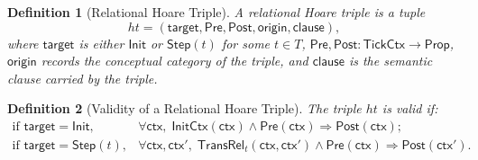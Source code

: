 \documentclass[11pt,a4paper]{article}
\newtheorem{definition}{Definition}[section]
\newcommand{\TickCtx}{\mathsf{TickCtx}}
\newcommand{\ctx}{\mathsf{ctx}}
\begin{document}
\begin{definition}[Relational Hoare Triple]
A relational Hoare triple is a tuple
\[
ht = (\mathsf{target},\mathsf{Pre},\mathsf{Post},\mathsf{origin},\mathsf{clause}),
\]
where \(\mathsf{target}\) is either \(\mathsf{Init}\) or \(\mathsf{Step}(t)\)
for some \(t \in T\), \(\mathsf{Pre},\mathsf{Post} : \TickCtx \to \mathsf{Prop}\),
\(\mathsf{origin}\) records the conceptual category of the triple, and
\(\mathsf{clause}\) is the semantic clause carried by the triple.
\end{definition}

\begin{definition}[Validity of a Relational Hoare Triple]
The triple \(ht\) is valid if:
\[
\begin{array}{ll}
\text{if } \mathsf{target}=\mathsf{Init}, & 
\forall \ctx,\; \mathsf{InitCtx}(\ctx) \land \mathsf{Pre}(\ctx)
\Rightarrow \mathsf{Post}(\ctx);\\[0.4em]
\text{if } \mathsf{target}=\mathsf{Step}(t), &
\forall \ctx,\ctx',\;
\mathsf{TransRel}_t(\ctx,\ctx') \land \mathsf{Pre}(\ctx)
\Rightarrow \mathsf{Post}(\ctx').
\end{array}
\]
\end{definition}
\end{document}
